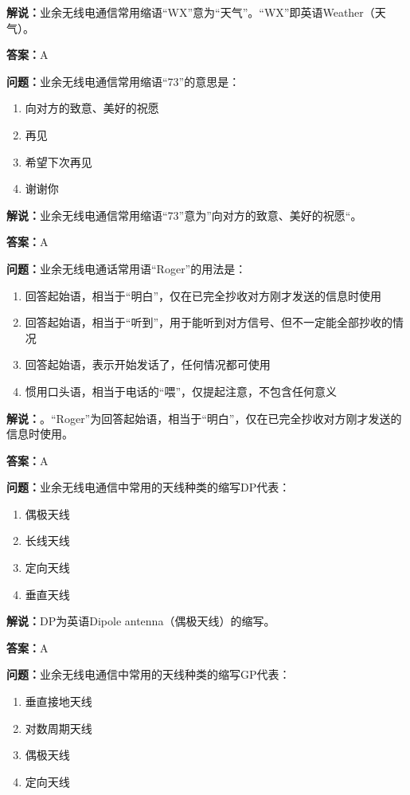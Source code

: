 \documentclass[UTF8]{ctexbook}
\begin{document}
\textbf{解说：}业余无线电通信常用缩语“WX”意为“天气”。“WX”即英语Weather（天气）。

\textbf{答案：}A

\textbf{问题：}业余无线电通信常用缩语“73”的意思是：

\begin{enumerate}[label=\Alph*), leftmargin=3em]
  \item 向对方的致意、美好的祝愿
  \item 再见
  \item 希望下次再见
  \item 谢谢你
\end{enumerate}

\textbf{解说：}业余无线电通信常用缩语“73”意为”向对方的致意、美好的祝愿“。

\textbf{答案：}A

\textbf{问题：}业余无线电通话常用语“Roger”的用法是：

\begin{enumerate}[label=\Alph*), leftmargin=3em]
  \item 回答起始语，相当于“明白”，仅在已完全抄收对方刚才发送的信息时使用
  \item 回答起始语，相当于“听到”，用于能听到对方信号、但不一定能全部抄收的情况
  \item 回答起始语，表示开始发话了，任何情况都可使用
  \item 惯用口头语，相当于电话的“喂”，仅提起注意，不包含任何意义
\end{enumerate}

\textbf{解说：}。“Roger”为回答起始语，相当于“明白”，仅在已完全抄收对方刚才发送的信息时使用。

\textbf{答案：}A

\textbf{问题：}业余无线电通信中常用的天线种类的缩写DP代表：

\begin{enumerate}[label=\Alph*), leftmargin=3em]
  \item 偶极天线
  \item 长线天线
  \item 定向天线
  \item 垂直天线
\end{enumerate}

\textbf{解说：}DP为英语Dipole antenna（偶极天线）的缩写。

\textbf{答案：}A

\textbf{问题：}业余无线电通信中常用的天线种类的缩写GP代表：

\begin{enumerate}[label=\Alph*), leftmargin=3em]
  \item 垂直接地天线
  \item 对数周期天线
  \item 偶极天线
  \item 定向天线
\end{enumerate}
\end{document}
